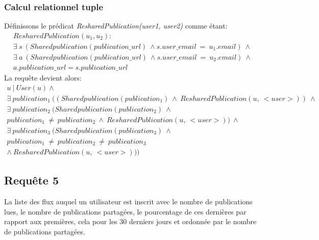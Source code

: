 \documentclass[a4paper,10pt]{article}
\begin{document}
\subsubsection{Calcul relationnel tuple}
Définissons le prédicat \emph{ResharedPublication(user1, user2)} comme étant:
\begin{equation*}
 \begin{split}
  ResharedPublication(u_1, u_2):\ \\
	  \exists\ s\ (Sharedpublication(publication\_url)\ \wedge s.user\_email\ =\ u_1.email)\ \wedge \\
	  \exists\ a\ (Sharedpublication(publication\_url)\ \wedge s.user\_email\ =\ u_2.email)\ \wedge \\
	  a.publication\_url = s.publication\_url
 \end{split}
\end{equation*}
La requête devient alors:
\begin{equation*}
 \begin{split}
       u\ |\ User(u) \wedge \\
       \exists \ publication_1 \ ((Sharedpublication(publication_1) \ \wedge \ ResharedPublication(u, \ <user>)) \ \wedge \\
       \exists \ publication_2 \ (Sharedpublication(publication_2) \ \wedge\\
       publication_1 \ \neq \ publication_2 \ \wedge \ ResharedPublication(u, \ <user>)) \ \wedge \\
       \exists \ publication_3 \ (Sharedpublication(publication_3) \ \wedge\\
       publication_1 \ \neq \ publication_2 \ \neq \ publication_3\\
       \wedge  \ ResharedPublication(u, \ <user>)))
 \end{split}
\end{equation*}    
\clearpage
\subsection{Requête 5}
La liste des flux auquel un utilisateur est inscrit avec le nombre de publications lues, le nombre de publications
partagées, le pourcentage de ces dernières par rapport aux premières, cela pour les 30 derniers jours et ordonnée
par le nombre de publications partagées.
\end{document}
